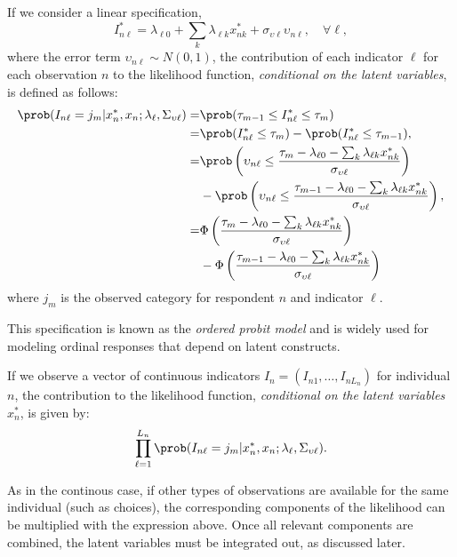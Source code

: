 \documentclass[12pt,a4paper]{article}
\begin{document}
If we consider a linear specification,
\begin{equation}
  \label{eq:measurement_latent}
I^*_{n\ell} = \lambda_{\ell 0}  + \sum_k \lambda_{\ell k}  x_{nk}^* + \sigma_{\upsilon \ell} \upsilon_{n\ell}, \quad \forall \ell,
\end{equation}
where the error term $\upsilon_{n\ell} \sim N(0,1)$,
the contribution of each indicator $\ell$ for each observation $n$ to the likelihood function, \emph{conditional on the latent variables}, is defined as follows:
\begin{equation}
  \label{eq:discreteMeas-d}
  \begin{aligned}
    \prob(I_{n\ell} = j_m| x^*_n, x_n ; \lambda_\ell, \Sigma_{\upsilon \ell})
    =& \prob(\tau_{m-1} \leq I^*_{n\ell} \leq \tau_m) \\
    =& \prob(I^*_{n\ell} \leq \tau_m) -  \prob(I^*_{n\ell} \leq \tau_{m-1}),\\
    =& \prob\left( \upsilon_{n\ell} \leq \frac{\tau_m -\lambda_{\ell 0}  - \sum_k \lambda_{\ell k}  x_{nk}^*}{\sigma_{\upsilon \ell}} \right) \\
    &-  \prob \left( \upsilon_{n\ell} \leq \frac{\tau_{m-1}- \lambda_{\ell 0}  - \sum_k \lambda_{\ell k}  x_{nk}^*}{\sigma_{\upsilon \ell}}\right), \\
    =& \Phi\left(  \frac{\tau_m -\lambda_{\ell 0}  - \sum_k \lambda_{\ell k}  x_{nk}^*}{\sigma_{\upsilon \ell}} \right) \\
    &-\Phi\left(\frac{\tau_{m-1}- \lambda_{\ell 0}  - \sum_k \lambda_{\ell k}  x_{nk}^*}{\sigma_{\upsilon \ell}}\right)
  \end{aligned}
\end{equation}
where $j_m$ is the observed category for respondent $n$ and indicator $\ell$.

This specification is known as the \emph{ordered probit model} and is
widely used for modeling ordinal responses that depend on latent
constructs.

If we observe a vector of continuous indicators \( I_n = (I_{n1}, \ldots, I_{nL_n}) \) for individual \( n \), the contribution to the likelihood function, \emph{conditional on the latent variables} \( x^*_{n} \), is given by:
\begin{equation}
\prod_{\ell=1}^{L_n} \prob(I_{n\ell} = j_m| x^*_n, x_n ; \lambda_\ell, \Sigma_{\upsilon \ell}).
\end{equation}

As in the continous case, if other types of observations are available
for the same individual (such as  choices), the corresponding
components of the likelihood can be multiplied with the expression
above. Once all relevant components are combined, the latent variables
must be integrated out, as discussed later.
\end{document}
